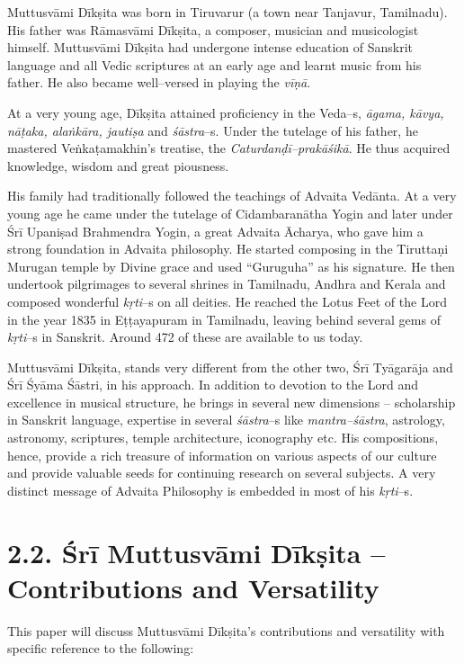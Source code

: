 Muttusvāmi Dīkṣita was born in Tiruvarur (a town near Tanjavur, Tamilnadu). His father was Rāmasvāmi Dīkṣita, a composer, musician and musicologist himself. Muttusvāmi Dīkṣita had undergone intense education of Sanskrit language and all Vedic scriptures at an early age and learnt music from his father. He also became well–versed in playing the \textit{vīṇā}.

At a very young age, Dīkṣita attained proficiency in the Veda–s, \textit{āgama, kāvya, nāṭaka, alaṅkāra, jautiṣa} and \textit{śāstra}–s. Under the tutelage of his father, he mastered Veṅkaṭamakhin’s treatise, the \textit{Caturdanḍī–prakāśikā}. He thus acquired knowledge, wisdom and great piousness.

His family had traditionally followed the teachings of Advaita Vedānta. At a very young age he came under the tutelage of Cidambaranātha Yogin and later under Śrī Upaniṣad Brahmendra Yogin, a great Advaita Ācharya, who gave him a strong foundation in Advaita philosophy. He started composing in the Tiruttaṇi Murugan temple by Divine grace and used “Guruguha” as his signature. He then undertook pilgrimages to several shrines in Tamilnadu, Andhra and Kerala and composed wonderful \textit{kṛti}–s on all deities. He reached the Lotus Feet of the Lord in the year 1835 in Eṭṭayapuram in Tamilnadu, leaving behind several gems of \textit{kṛti}–s in Sanskrit. Around 472 of these are available to us today.

Muttusvāmi Dīkṣita, stands very different from the other two, Śrī Tyāgarāja and Śrī Śyāma Śāstri, in his approach. In addition to devotion to the Lord and excellence in musical structure, he brings in several new dimensions – scholarship in Sanskrit language, expertise in several \textit{śāstra}–s like \textit{mantra–śāstra}, astrology, astronomy, scriptures, temple architecture, iconography etc. His compositions, hence, provide a rich treasure of information on various aspects of our culture and provide valuable seeds for continuing research on several subjects. A very distinct message of Advaita Philosophy is embedded in most of his \textit{kṛti}–s.


\section*{2.2. Śrī Muttusvāmi Dīkṣita – Contributions and Versatility}

This paper will discuss Muttusvāmi Dīkṣita’s contributions and versatility with specific reference to the following:

